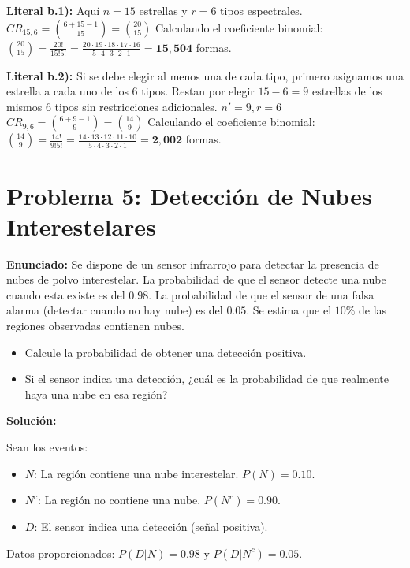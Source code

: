 \documentclass[12pt]{article}
\begin{document}
\textbf{Literal b.1):} 
Aquí $n = 15$ estrellas y $r = 6$ tipos espectrales.
$CR_{15,6} = \binom{6 + 15 - 1}{15} = \binom{20}{15}$
Calculando el coeficiente binomial:
$\binom{20}{15} = \frac{20!}{15!5!} = \frac{20 \cdot 19 \cdot 18 \cdot 17 \cdot 16}{5 \cdot 4 \cdot 3 \cdot 2 \cdot 1} = \mathbf{15,504}$ formas.

\textbf{Literal b.2):} 
Si se debe elegir al menos una de cada tipo, primero asignamos una estrella a cada uno de los 6 tipos. Restan por elegir $15 - 6 = 9$ estrellas de los mismos 6 tipos sin restricciones adicionales.
$n' = 9, r = 6$
$CR_{9,6} = \binom{6 + 9 - 1}{9} = \binom{14}{9}$
Calculando el coeficiente binomial:
$\binom{14}{9} = \frac{14!}{9!5!} = \frac{14 \cdot 13 \cdot 12 \cdot 11 \cdot 10}{5 \cdot 4 \cdot 3 \cdot 2 \cdot 1} = \mathbf{2,002}$ formas.

\section*{Problema 5: Detección de Nubes Interestelares}

\textbf{Enunciado:}
Se dispone de un sensor infrarrojo para detectar la presencia de nubes de polvo interestelar. La probabilidad de que el sensor detecte una nube cuando esta existe es del $0.98$. La probabilidad de que el sensor de una falsa alarma (detectar cuando no hay nube) es del $0.05$. Se estima que el $10\%$ de las regiones observadas contienen nubes.

\begin{itemize}
    \item[\textbf{a)}] Calcule la probabilidad de obtener una detección positiva.
    \item[\textbf{b)}] Si el sensor indica una detección, ¿cuál es la probabilidad de que realmente haya una nube en esa región?
\end{itemize}

\textbf{Solución:}

Sean los eventos:
\begin{itemize}
    \item $N$: La región contiene una nube interestelar. $P(N) = 0.10$.
    \item $N^c$: La región no contiene una nube. $P(N^c) = 0.90$.
    \item $D$: El sensor indica una detección (señal positiva).
\end{itemize}

Datos proporcionados: $P(D|N) = 0.98$ y $P(D|N^c) = 0.05$.
\end{document}
